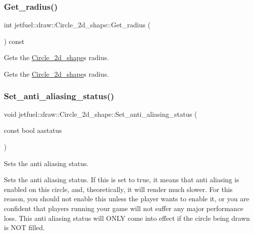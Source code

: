 \subsubsection{\texorpdfstring{Get\+\_\+radius()}{Get\_radius()}}
{\footnotesize\ttfamily int jetfuel\+::draw\+::\+Circle\+\_\+2d\+\_\+shape\+::\+Get\+\_\+radius (\begin{DoxyParamCaption}{ }\end{DoxyParamCaption}) const\hspace{0.3cm}{\ttfamily [inline]}}



Gets the \hyperlink{classjetfuel_1_1draw_1_1Circle__2d__shape}{Circle\+\_\+2d\+\_\+shape}\textquotesingle{}s radius. 

Gets the \hyperlink{classjetfuel_1_1draw_1_1Circle__2d__shape}{Circle\+\_\+2d\+\_\+shape}\textquotesingle{}s radius. \mbox{\label{classjetfuel_1_1draw_1_1Circle__2d__shape_a2af81e6479bc9d55b7df7e3c0a392630}} 
\subsubsection{\texorpdfstring{Set\+\_\+anti\+\_\+aliasing\+\_\+status()}{Set\_anti\_aliasing\_status()}}
{\footnotesize\ttfamily void jetfuel\+::draw\+::\+Circle\+\_\+2d\+\_\+shape\+::\+Set\+\_\+anti\+\_\+aliasing\+\_\+status (\begin{DoxyParamCaption}\item[{const bool}]{aastatus }\end{DoxyParamCaption})\hspace{0.3cm}{\ttfamily [inline]}}



Sets the anti aliasing status. 

Sets the anti aliasing status. If this is set to true, it means that anti aliasing is enabled on this circle, and, theoretically, it will render much slower. For this reason, you should not enable this unless the player wants to enable it, or you are confident that players running your game will not suffer any major performance loss. This anti aliasing status will O\+N\+LY come into effect if the circle being drawn is N\+OT filled.



